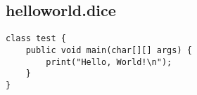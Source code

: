 \subsection{helloworld.dice}
\begin{verbatim}
class test {
	public void main(char[][] args) {
		print("Hello, World!\n");
	}
}

\end{verbatim}